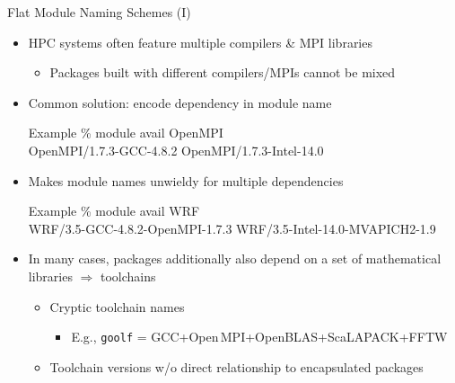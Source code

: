 \documentclass[10pt,xcolor={usenames,dvipsnames}]{beamer}
\begin{document}

\begin{frame}{Flat Module Naming Schemes (I)}
\begin{itemize}
    \item
        HPC systems often feature multiple compilers \& MPI libraries
        \begin{itemize}
            \item
                Packages built with different compilers/MPIs cannot
                be mixed
        \end{itemize}
    \item
        Common solution: encode dependency in module name\\
        \enskip
        \begin{minipage}{0.9\textwidth}
            \begin{exampleblock}{Example}
                \ttfamily
                \% module avail OpenMPI\\
                OpenMPI/1.7.3-GCC-4.8.2
                    \quad OpenMPI/1.7.3-Intel-14.0
            \end{exampleblock}
        \end{minipage}
    \smallskip
    \item
        Makes module names unwieldy for multiple dependencies\\
        \enskip
        \begin{minipage}{0.9\textwidth}
            \begin{exampleblock}{Example}
                \ttfamily
                \% module avail WRF\\
                WRF/3.5-GCC-4.8.2-OpenMPI-1.7.3
                    \quad WRF/3.5-Intel-14.0-MVAPICH2-1.9
            \end{exampleblock}
        \end{minipage}
    \smallskip
    \item
        In many cases, packages additionally also depend on a set of
        mathematical libraries $\Rightarrow$ toolchains
        \begin{itemize}
            \item
                Cryptic toolchain names
                \begin{itemize}
                    \item
                        E.g., \texttt{goolf} = GCC+Open\,MPI+OpenBLAS+ScaLAPACK+FFTW
                \end{itemize}
            \item
                Toolchain versions w/o direct relationship to encapsulated packages
        \end{itemize}
\end{itemize}
\end{frame}
\end{document}

